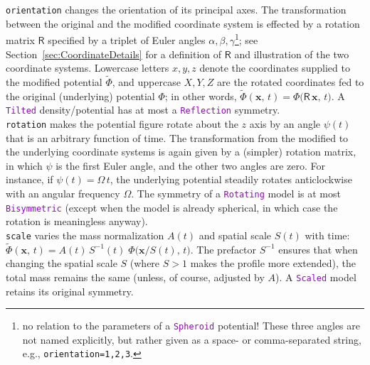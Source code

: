 \documentclass[12pt]{article}
\newcommand{\ttt}[1]{\textcolor{darkviolet}{\texttt{#1}}}
\newcommand{\ppp}[1]{\textcolor{darkolive} {\texttt{#1}}}
\begin{document}
\begin{itemize}
%
\ppp{orientation} changes the orientation of its principal axes. The transformation between the original and the modified coordinate system is effected by a rotation matrix $\mathsf{R}$ specified by a triplet of Euler angles $\alpha,\beta,\gamma$\footnote{no relation to the parameters of a \ttt{Spheroid} potential! These three angles are not named explicitly, but rather given as a space- or comma-separated string, e.g., \ppp{orientation=1,2,3}.}; see Section~\ref{sec:CoordinateDetails} for a definition of $\mathsf{R}$ and illustration of the two coordinate systems. Lowercase letters $x,y,z$ denote the coordinates supplied to the modified potential $\widetilde\Phi$, and uppercase $X,Y,Z$ are the rotated coordinates fed to the original (underlying) potential $\Phi$; in other words, $\widetilde\Phi(\boldsymbol x,\,t) = \Phi\big(\mathsf{R}\,\boldsymbol x,\,t\big)$. A \ttt{Tilted} density/potential has at most a \ttt{Reflection} symmetry.\\
%
\ppp{rotation} makes the potential figure rotate about the $z$ axis by an angle $\psi(t)$ that is an arbitrary function of time. The transformation from the modified to the underlying coordinate systems is again given by a (simpler) rotation matrix, in which $\psi$ is the first Euler angle, and the other two angles are zero. For instance, if $\psi(t) = \Omega\,t$, the underlying potential steadily rotates anticlockwise with an angular frequency $\Omega$. The symmetry of a \ttt{Rotating} model is at most \ttt{Bisymmetric} (except when the model is already spherical, in which case the rotation is meaningless anyway).\\
%
\ppp{scale} varies the mass normalization $A(t)$ and spatial scale $S(t)$ with time: $\widetilde\Phi(\boldsymbol x,\,t) = A(t)\,S^{-1}(t)\; \Phi\big(\boldsymbol x/S(t),\,t\big)$. The prefactor $S^{-1}$ ensures that when changing the spatial scale $S$ (where $S>1$ makes the profile more extended), the total mass remains the same (unless, of course, adjusted by $A$). A \ttt{Scaled} model retains its original symmetry.\\[1mm]
%

\end{itemize}
\end{document}
